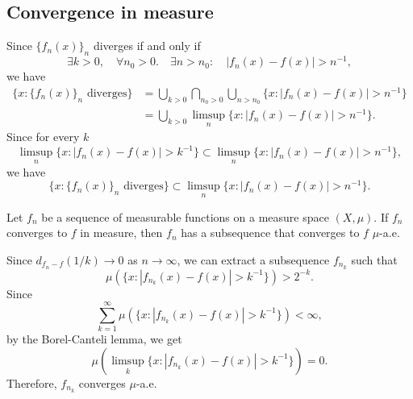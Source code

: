 \documentclass{../crs}
\begin{document}
\subsection{Convergence in measure}
Since $\{f_n(x)\}_n$ diverges if and only if
\[\exists k>0,\quad\forall n_0>0.\quad\exists n>n_0:\quad |f_n(x)-f(x)|>n^{-1},\]
we have
\begin{align*}
\{x:\{f_n(x)\}_n\text{ diverges}\}&=\bigcup_{k>0}\bigcap_{n_0>0}\bigcup_{n>n_0}\{x:|f_n(x)-f(x)|>n^{-1}\}\\
&=\bigcup_{k>0}\limsup_n\{x:|f_n(x)-f(x)|>n^{-1}\}.
\end{align*}
Since for every $k$
\[\limsup_n\{x:|f_n(x)-f(x)|>k^{-1}\}\subset\limsup_n\{x:|f_n(x)-f(x)|>n^{-1}\},\]
we have
\[\{x:\{f_n(x)\}_n\text{ diverges}\}\subset\limsup_n\{x:|f_n(x)-f(x)|>n^{-1}\}.\]




\begin{thm}
Let $f_n$ be a sequence of measurable functions on a measure space $(X,\mu)$.
If $f_n$ converges to $f$ in measure, then $f_n$ has a subsequence that converges to $f$ $\mu$-a.e.
\end{thm}
\begin{pf}
Since $d_{f_n-f}(1/k)\to0$ as $n\to\infty$, we can extract a subsequence $f_{n_k}$ such that
\[\mu(\{x:|f_{n_k}(x)-f(x)|>k^{-1}\})>2^{-k}.\]
Since
\[\sum_{k=1}^\infty\mu(\{x:|f_{n_k}(x)-f(x)|>k^{-1}\})<\infty,\]
by the Borel-Canteli lemma, we get
\[\mu(\limsup_k\{x:|f_{n_k}(x)-f(x)|>k^{-1}\})=0.\]
Therefore, $f_{n_k}$ converges $\mu$-a.e.
\end{pf}
\end{document}

